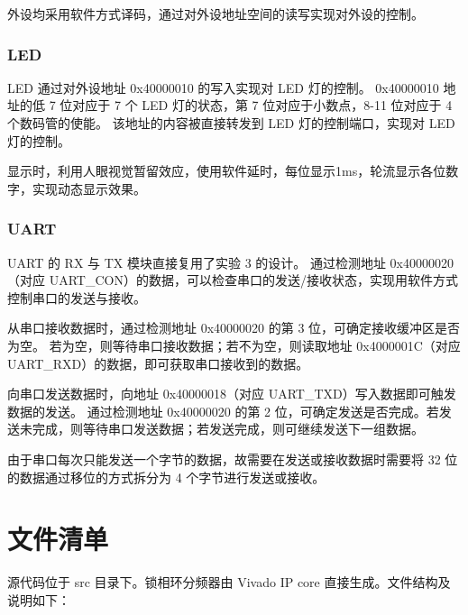 \documentclass[a4paper]{article}  %
\begin{document}
外设均采用软件方式译码，通过对外设地址空间的读写实现对外设的控制。

\subsubsection{LED}

LED 通过对外设地址 0x40000010 的写入实现对 LED 灯的控制。
0x40000010 地址的低 7 位对应于 7 个 LED 灯的状态，第 7 位对应于小数点，8-11 位对应于 4 个数码管的使能。
该地址的内容被直接转发到 LED 灯的控制端口，实现对 LED 灯的控制。

显示时，利用人眼视觉暂留效应，使用软件延时，每位显示1ms，轮流显示各位数字，实现动态显示效果。

\subsubsection{UART}

UART 的 RX 与 TX 模块直接复用了实验 3 的设计。
通过检测地址 0x40000020（对应 UART\_CON）的数据，可以检查串口的发送/接收状态，实现用软件方式控制串口的发送与接收。

从串口接收数据时，通过检测地址 0x40000020 的第 3 位，可确定接收缓冲区是否为空。
若为空，则等待串口接收数据；若不为空，则读取地址 0x4000001C（对应 UART\_RXD）的数据，即可获取串口接收到的数据。

向串口发送数据时，向地址 0x40000018（对应 UART\_TXD）写入数据即可触发数据的发送。
通过检测地址 0x40000020 的第 2 位，可确定发送是否完成。若发送未完成，则等待串口发送数据；若发送完成，则可继续发送下一组数据。

由于串口每次只能发送一个字节的数据，故需要在发送或接收数据时需要将 32 位的数据通过移位的方式拆分为 4 个字节进行发送或接收。

\section{文件清单}

源代码位于 src 目录下。锁相环分频器由 Vivado IP core 直接生成。文件结构及说明如下：
\end{document}
